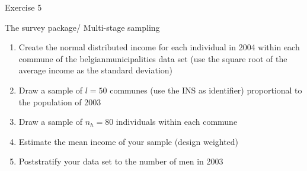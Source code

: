 \documentclass[11pt,german,hideothersubsections]{beamer}
\begin{document}
\begin{frame}[fragile]{Exercise 5}
\footnotesize{
\begin{exampleblock}{The survey package/ Multi-stage sampling}
\begin{enumerate}
\item Create the normal distributed income for each individual in 2004 within each commune of the belgianmunicipalities data set (use the square root of the average income as the standard deviation)
\item Draw a sample of $l=50$ communes (use the INS as identifier) proportional to the population of 2003
\item Draw a sample of $n_h=80$ individuals within each commune
\item Estimate the mean income of your sample (design weighted)
\item Poststratify your data set to the number of men in 2003
\end{enumerate}
\end{exampleblock}
}
\end{frame}


\end{document}
